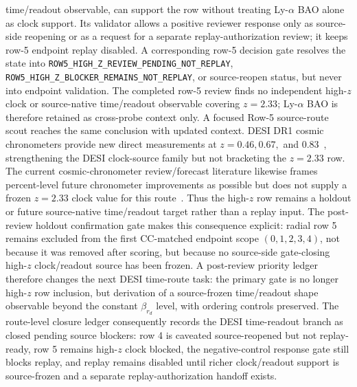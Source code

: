 \documentclass[11pt]{article}
\begin{document}
time/readout observable, can support the row without treating Ly-\(\alpha\) BAO
alone as clock support.  Its validator allows a positive reviewer response only
as source-side reopening or as a request for a separate replay-authorization
review; it keeps row-5 endpoint replay disabled.  A corresponding row-5
decision gate resolves the state into
\texttt{ROW5\_\allowbreak{}HIGH\_\allowbreak{}Z\_\allowbreak{}REVIEW\_\allowbreak{}PENDING\_\allowbreak{}NOT\_\allowbreak{}REPLAY},
\texttt{ROW5\_\allowbreak{}HIGH\_\allowbreak{}Z\_\allowbreak{}BLOCKER\_\allowbreak{}REMAINS\_\allowbreak{}NOT\_\allowbreak{}REPLAY}, or source-reopen
status, but never into endpoint validation.
The completed row-5 review finds no independent high-\(z\) clock or
source-native time/readout observable covering \(z=2.33\); Ly-\(\alpha\) BAO is
therefore retained as cross-probe context only.
A focused Row-5 source-route scout reaches the same conclusion with updated
context.  DESI DR1 cosmic chronometers provide new direct measurements at
\(z=0.46,0.67,\) and \(0.83\)~\cite{Loubser2025DESICC}, strengthening the DESI
clock-source family but not bracketing the \(z=2.33\) row.  The current
cosmic-chronometer review/forecast literature likewise frames percent-level
future chronometer improvements as possible but does not supply a frozen
\(z=2.33\) clock value for this route~\cite{Moresco2024CosmicChronometers}.
Thus the high-\(z\) row remains a holdout or future source-native time/readout
target rather than a replay input.
The post-review holdout confirmation gate makes this consequence explicit:
radial row 5 remains excluded from the first CC-matched endpoint scope
\((0,1,2,3,4)\), not because it was removed after scoring, but because no
source-side gate-closing high-\(z\) clock/readout source has been frozen.
A post-review priority ledger therefore changes the next DESI time-route task:
the primary gate is no longer high-\(z\) row inclusion, but derivation of a
source-frozen time/readout shape observable beyond the constant
\(\beta_{r_d}\) level, with ordering controls preserved.
The route-level closure ledger consequently records the DESI time-readout
branch as closed pending source blockers: row 4 is caveated source-reopened but
not replay-ready, row 5 remains high-\(z\) clock blocked, the negative-control
response gate still blocks replay, and replay remains disabled until richer
clock/readout support is source-frozen and a separate replay-authorization
handoff exists.
\end{document}
